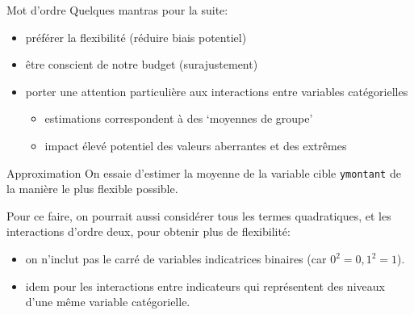 \documentclass[
  ignorenonframetext,
]{beamer}
\providecommand{\tightlist}{%
  \setlength{\itemsep}{0pt}\setlength{\parskip}{0pt}}
\begin{document}
\begin{frame}{Mot d'ordre}
\protect{}\label{mot-dordre}
Quelques mantras pour la suite:

\begin{itemize}
\tightlist
\item
  préférer la flexibilité (réduire biais potentiel)
\item
  être conscient de notre budget (surajustement)
\item
  porter une attention particulière aux interactions entre variables
  catégorielles

  \begin{itemize}
  \tightlist
  \item
    estimations correspondent à des `moyennes de groupe'
  \item
    impact élevé potentiel des valeurs aberrantes et des extrêmes
  \end{itemize}
\end{itemize}
\end{frame}

\begin{frame}[fragile]{Approximation}
\protect{}\label{approximation}
On essaie d'estimer la moyenne de la variable cible \texttt{ymontant} de
la manière le plus flexible possible.

Pour ce faire, on pourrait aussi considérer tous les termes
quadratiques, et les interactions d'ordre deux, pour obtenir plus de
flexibilité:

\begin{itemize}
\tightlist
\item
  on n'inclut pas le carré de variables indicatrices binaires (car
  \(0^2=0, 1^2=1\)).
\item
  idem pour les interactions entre indicateurs qui représentent des
  niveaux d'une même variable catégorielle.
\end{itemize}
\end{frame}
\end{document}
